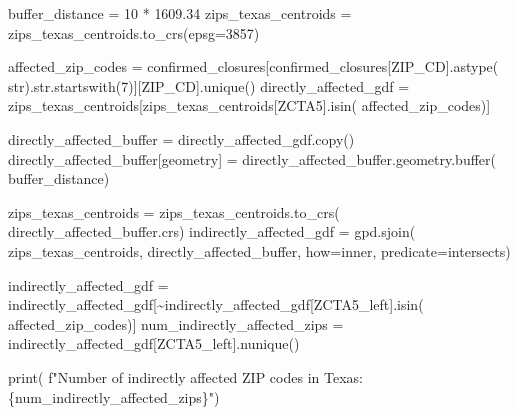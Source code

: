 \documentclass[
  letterpaper,
  DIV=11,
  numbers=noendperiod]{scrartcl}
\newenvironment{Shaded}{\begin{snugshade}}{\end{snugshade}}
\newcommand{\BuiltInTok}[1]{\textcolor[rgb]{0.00,0.23,0.31}{#1}}
\newcommand{\DecValTok}[1]{\textcolor[rgb]{0.68,0.00,0.00}{#1}}
\newcommand{\FloatTok}[1]{\textcolor[rgb]{0.68,0.00,0.00}{#1}}
\newcommand{\NormalTok}[1]{\textcolor[rgb]{0.00,0.23,0.31}{#1}}
\newcommand{\OperatorTok}[1]{\textcolor[rgb]{0.37,0.37,0.37}{#1}}
\newcommand{\SpecialCharTok}[1]{\textcolor[rgb]{0.37,0.37,0.37}{#1}}
\newcommand{\SpecialStringTok}[1]{\textcolor[rgb]{0.13,0.47,0.30}{#1}}
\newcommand{\StringTok}[1]{\textcolor[rgb]{0.13,0.47,0.30}{#1}}
\begin{document}
\begin{Shaded}
\begin{Highlighting}[]
\NormalTok{buffer\_distance }\OperatorTok{=} \DecValTok{10} \OperatorTok{*} \FloatTok{1609.34}
\NormalTok{zips\_texas\_centroids }\OperatorTok{=}\NormalTok{ zips\_texas\_centroids.to\_crs(epsg}\OperatorTok{=}\DecValTok{3857}\NormalTok{)}

\NormalTok{affected\_zip\_codes }\OperatorTok{=}\NormalTok{ confirmed\_closures[confirmed\_closures[}\StringTok{\textquotesingle{}ZIP\_CD\textquotesingle{}}\NormalTok{].astype(}
    \BuiltInTok{str}\NormalTok{).}\BuiltInTok{str}\NormalTok{.startswith(}\StringTok{\textquotesingle{}7\textquotesingle{}}\NormalTok{)][}\StringTok{\textquotesingle{}ZIP\_CD\textquotesingle{}}\NormalTok{].unique()}
\NormalTok{directly\_affected\_gdf }\OperatorTok{=}\NormalTok{ zips\_texas\_centroids[zips\_texas\_centroids[}\StringTok{\textquotesingle{}ZCTA5\textquotesingle{}}\NormalTok{].isin(}
\NormalTok{    affected\_zip\_codes)]}

\NormalTok{directly\_affected\_buffer }\OperatorTok{=}\NormalTok{ directly\_affected\_gdf.copy()}
\NormalTok{directly\_affected\_buffer[}\StringTok{\textquotesingle{}geometry\textquotesingle{}}\NormalTok{] }\OperatorTok{=}\NormalTok{ directly\_affected\_buffer.geometry.}\BuiltInTok{buffer}\NormalTok{(}
\NormalTok{    buffer\_distance)}

\NormalTok{zips\_texas\_centroids }\OperatorTok{=}\NormalTok{ zips\_texas\_centroids.to\_crs(}
\NormalTok{    directly\_affected\_buffer.crs)}
\NormalTok{indirectly\_affected\_gdf }\OperatorTok{=}\NormalTok{ gpd.sjoin(}
\NormalTok{    zips\_texas\_centroids, directly\_affected\_buffer, how}\OperatorTok{=}\StringTok{\textquotesingle{}inner\textquotesingle{}}\NormalTok{, predicate}\OperatorTok{=}\StringTok{\textquotesingle{}intersects\textquotesingle{}}\NormalTok{)}

\NormalTok{indirectly\_affected\_gdf }\OperatorTok{=}\NormalTok{ indirectly\_affected\_gdf[}\OperatorTok{\textasciitilde{}}\NormalTok{indirectly\_affected\_gdf[}\StringTok{\textquotesingle{}ZCTA5\_left\textquotesingle{}}\NormalTok{].isin(}
\NormalTok{    affected\_zip\_codes)]}
\NormalTok{num\_indirectly\_affected\_zips }\OperatorTok{=}\NormalTok{ indirectly\_affected\_gdf[}\StringTok{\textquotesingle{}ZCTA5\_left\textquotesingle{}}\NormalTok{].nunique()}

\BuiltInTok{print}\NormalTok{(}
    \SpecialStringTok{f"Number of indirectly affected ZIP codes in Texas: }\SpecialCharTok{\{}\NormalTok{num\_indirectly\_affected\_zips}\SpecialCharTok{\}}\SpecialStringTok{"}\NormalTok{)}
\end{Highlighting}
\end{Shaded}
\end{document}
